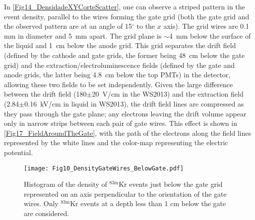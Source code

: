 \documentclass[a4paper,11pt]{article}
\begin{document}
In \cref{Fig14_DensidadeXYCorteScatter}, one can observe a striped pattern in the event density, parallel to the wires forming the gate grid (both the gate grid and the observed pattern are at an angle of 15${}^{\circ}$ to the $x$ axis). The  grid wires are 0.1 mm in diameter and 5~mm apart. The grid plane is $\sim$4~mm below the surface of the liquid and 1~cm below the anode grid. This grid separates the drift field (defined by the cathode and gate grids, the former being  48~cm below the gate grid) and the extraction/electroluminescence fields (defined by the gate and anode grids, the latter being 4.8~cm below the top PMTs) in the detector, allowing these two fields to be set independently. Given the large difference between the drift field (180$\pm$20~V/cm in the WS2013) and the extraction field (2.84$\pm$0.16~kV/cm in liquid in WS2013), the drift field lines are compressed as they pass through the gate plane; any electrons leaving the drift volume appear only in narrow strips between each pair of gate wires. This effect is shown in \cref{Fig17_FieldAroundTheGate}, with the path of the electrons along the field lines represented by the white lines and the color-map representing the electric potential. 

\begin{figure}
\begin{center}
\texttt{[image: Fig10\_DensityGateWires\_BelowGate.pdf]}	
\caption{Histogram of the density of ${}^{\mathrm{83m}}$Kr events just below the gate grid represented on an axis perpendicular to the orientation of the gate wires.  Only ${}^{\mathrm{83m}}$Kr events at a depth less than 1 cm below the gate are considered.}
\label{Fig18_DensityGateWires_BelowGate}
\end{center}
\end{figure}
\end{document}
